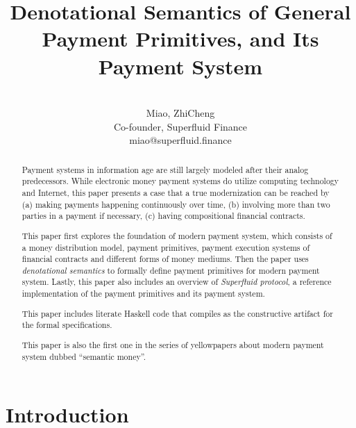 




\title{Denotational Semantics of General Payment Primitives, and Its Payment System}

\author{\\
    Miao, ZhiCheng\\
    Co-founder, Superfluid Finance\\
    miao@superfluid.finance
}


\maketitle

\begin{abstract}
Payment systems in information age are still largely modeled after their analog predecessors. While
electronic money payment systems do utilize computing technology and Internet, this paper presents a
case that a true modernization can be reached by (a) making payments happening continuously over
time, (b) involving more than two parties in a payment if necessary, (c) having compositional
financial contracts.

This paper first explores the foundation of modern payment system, which consists of a money
distribution model, payment primitives, payment execution systems of financial contracts and
different forms of money mediums. Then the paper uses \textit{denotational semantics} to formally
define payment primitives for modern payment system. Lastly, this paper also includes an overview
of \textit{Superfluid protocol}, a reference implementation of the payment primitives and its
payment system.

This paper includes literate Haskell code that compiles as the constructive artifact for the formal
specifications.

This paper is also the first one in the series of yellowpapers about modern payment system dubbed
``semantic money''.

\end{abstract}

\part*{Introduction}


